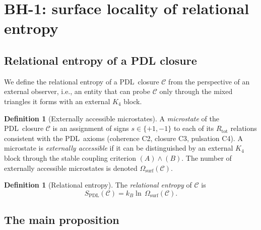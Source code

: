 \documentclass[11pt,a4paper]{article}
\theoremstyle{plain}
\theoremstyle{definition}
\newtheorem{definition}[theorem]{Definition}
\theoremstyle{remark}
\newcommand{\PDL}{\textsc{PDL}}
\newcommand{\Kfour}{K_4}
\newcommand{\Rtot}{R_{\mathrm{tot}}}
\newcommand{\SPDL}{S_{\mathrm{PDL}}}
\newcommand{\Omsurf}{\Omega_{\mathrm{surf}}}
\begin{document}
\section{BH-1: surface locality of relational entropy}
\label{sec:bh1}

\subsection{Relational entropy of a PDL closure}

We define the relational entropy of a \PDL\ closure $\mathcal{C}$ from the perspective
of an external observer, i.e., an entity that can probe $\mathcal{C}$ only through
the mixed triangles it forms with an external $\Kfour$ block.

\begin{definition}[Externally accessible microstates]
\label{def:microstates}
A \emph{microstate} of the \PDL\ closure $\mathcal{C}$ is an assignment of signs
$s \in \{+1,-1\}$ to each of its $\Rtot$ relations consistent with the \PDL\ axioms
(coherence C2, closure C3, pulsation C4). A microstate is
\emph{externally accessible} if it can be distinguished by an external $\Kfour$ block
through the stable coupling criterion $(A)\wedge(B)$. The number of externally
accessible microstates is denoted $\Omsurf(\mathcal{C})$.
\end{definition}

\begin{definition}[Relational entropy]
\label{def:entropy}
The \emph{relational entropy} of $\mathcal{C}$ is
\begin{equation}
  \SPDL(\mathcal{C}) = k_B \ln\,\Omsurf(\mathcal{C}).
  \label{eq:Spdl}
\end{equation}
\end{definition}

\subsection{The main proposition}
\end{document}
